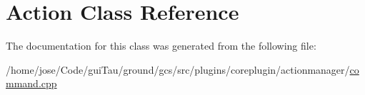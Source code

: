 \hypertarget{class_action}{\section{Action Class Reference}
\label{class_action}
}


The documentation for this class was generated from the following file\-:\begin{DoxyCompactItemize}
\item 
/home/jose/\-Code/gui\-Tau/ground/gcs/src/plugins/coreplugin/actionmanager/\hyperlink{command_8cpp}{command.\-cpp}\end{DoxyCompactItemize}
